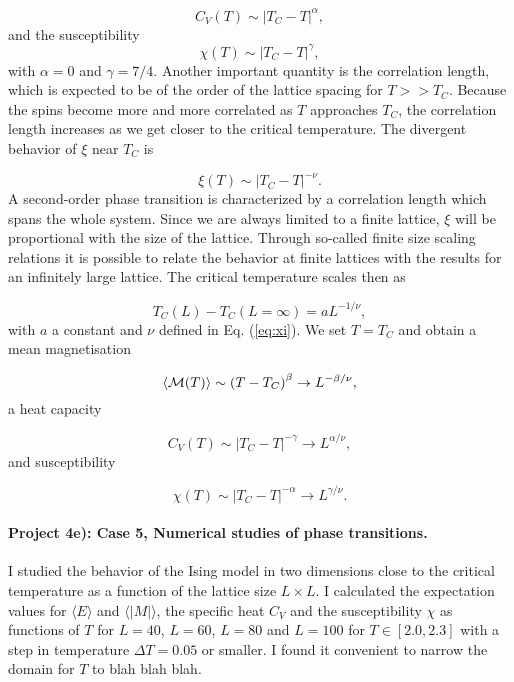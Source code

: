 \documentclass[10pt,showpacs,preprintnumbers,footinbib,amsmath,amssymb,aps,prl,twocolumn,groupedaddress,superscriptaddress,showkeys]{revtex4-1}
\begin{document}
\[
  C_V(T) \sim \left|T_C-T\right|^{\alpha},
\]
and the susceptibility
\begin{equation}
  \chi(T) \sim \left|T_C-T\right|^{\gamma},
\end{equation}
with $\alpha = 0$ and $\gamma = 7/4$.
Another important quantity is the correlation length, which is expected
to be of the order of the lattice spacing for $T>> T_C$. Because the spins
become more and more correlated as $T$ approaches $T_C$, the correlation
length increases as we get closer to the critical temperature. The divergent
behavior of $\xi$ near $T_C$ 
is

\begin{equation}
  \xi(T) \sim \left|T_C-T\right|^{-\nu}.
  \label{eq:xi}
\end{equation}
A second-order phase transition is characterized by a
correlation length which spans the whole system.
Since we are always limited to a finite lattice, $\xi$ will
be proportional with the size of the lattice. 
Through so-called finite size scaling relations
it is possible to relate the behavior at finite lattices with the 
results for an infinitely large lattice.
The critical temperature scales then as

\begin{equation}
 T_C(L)-T_C(L=\infty) = aL^{-1/\nu},
 \label{eq:tc}
\end{equation}
with  $a$ a constant and  $\nu$ defined in Eq. (\ref{eq:xi}).
We set $T=T_C$ and obtain a mean magnetisation

\begin{equation}
  \langle {\cal M}(T) \rangle \sim \left(T-T_C\right)^{\beta}
  \rightarrow L^{-\beta/\nu},
  \label{eq:scale1}
\end{equation}
a heat capacity

\begin{equation}
  C_V(T) \sim \left|T_C-T\right|^{-\gamma} \rightarrow L^{\alpha/\nu},
  \label{eq:scale2}
\end{equation}
and susceptibility

\begin{equation}
  \chi(T) \sim \left|T_C-T\right|^{-\alpha} \rightarrow L^{\gamma/\nu}.
  \label{eq:scale3}
\end{equation}


\paragraph{Project 4e): Case 5, Numerical studies of phase transitions.}
I studied the behavior of the Ising model in two dimensions close to the critical temperature as a function of the lattice size $L\times L$. I calculated the expectation values for $\langle E\rangle$ and $\langle \vert M\vert\rangle$, the specific heat
$C_V$ and the susceptibility $\chi$ as functions of $T$ for $L=40$,
$L=60$, $L=80$ and $L=100$ for $T\in [2.0,2.3]$ with a step in
temperature $\Delta T=0.05$ or smaller.  I found it convenient to narrow the domain for $T$ to blah blah blah. 
\end{document}
